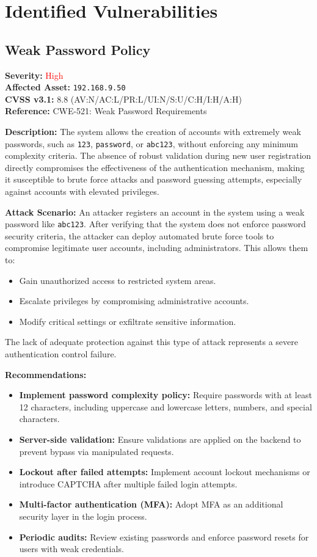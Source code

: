 \documentclass[a4paper,12pt]{article}
\begin{document}
\clearpage

\section{Identified Vulnerabilities}

\subsection{Weak Password Policy}
\textbf{Severity:} \textcolor{Red}{High} \\
\textbf{Affected Asset:} \texttt{192.168.9.50} \\
\textbf{CVSS v3.1:} 8.8 (AV:N/AC:L/PR:L/UI:N/S:U/C:H/I:H/A:H) \\
\textbf{Reference:} CWE-521: Weak Password Requirements

\textbf{Description:}  
The system allows the creation of accounts with extremely weak passwords, such as \texttt{123}, \texttt{password}, or \texttt{abc123}, without enforcing any minimum complexity criteria. The absence of robust validation during new user registration directly compromises the effectiveness of the authentication mechanism, making it susceptible to brute force attacks and password guessing attempts, especially against accounts with elevated privileges.

\textbf{Attack Scenario:}  
An attacker registers an account in the system using a weak password like \texttt{abc123}. After verifying that the system does not enforce password security criteria, the attacker can deploy automated brute force tools to compromise legitimate user accounts, including administrators. This allows them to:  
\begin{itemize}
    \item Gain unauthorized access to restricted system areas.  
    \item Escalate privileges by compromising administrative accounts.  
    \item Modify critical settings or exfiltrate sensitive information.  
\end{itemize}
The lack of adequate protection against this type of attack represents a severe authentication control failure.

\textbf{Recommendations:}  
\begin{itemize}
    \item \textbf{Implement password complexity policy:} Require passwords with at least 12 characters, including uppercase and lowercase letters, numbers, and special characters.  
    \item \textbf{Server-side validation:} Ensure validations are applied on the backend to prevent bypass via manipulated requests.  
    \item \textbf{Lockout after failed attempts:} Implement account lockout mechanisms or introduce CAPTCHA after multiple failed login attempts.  
    \item \textbf{Multi-factor authentication (MFA):} Adopt MFA as an additional security layer in the login process.  
    \item \textbf{Periodic audits:} Review existing passwords and enforce password resets for users with weak credentials.  
\end{itemize}
\end{document}
